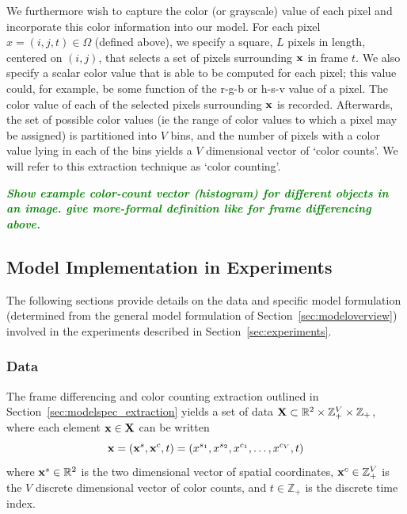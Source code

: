 \documentclass[smallcondensed, final]{svjour3}
\newcommand{\willie}[1]{\textcolor{green}{\textsf{\emph{\textbf{\textcolor{green}{#1}}}}}}
\begin{document}
We furthermore wish to capture the color (or grayscale) value of each pixel and incorporate this color information into our model. For each pixel $x = (i, j, t) \in \Omega$ (defined above), we specify a square, $L$ pixels in length, centered on $(i, j)$, that selects a set of pixels surrounding $\bold{x}$ in frame $t$. We also specify a scalar color value that is able to be computed for each pixel; this value could, for example, be some function of the r-g-b or h-s-v value of a pixel. The color value of each of the selected pixels surrounding $\bold{x}$ is recorded. Afterwards, the set of possible color values (ie the range of color values to which a pixel may be assigned) is partitioned into $V$ bins, and the number of pixels with a color value lying in each of the bins yields a $V$ dimensional vector of `color counts'. We will refer to this extraction technique as `color counting'.

\willie{Show example color-count vector (histogram) for different objects in an image. give more-formal definition like for frame differencing above.}






\subsection{Model Implementation in Experiments}

The following sections provide details on the data and specific model formulation (determined from the general model formulation of Section~\ref{sec:modeloverview}) involved in the experiments described in Section~\ref{sec:experiments}.






\subsubsection{Data}

The frame differencing and color counting extraction outlined in Section~\ref{sec:modelspec_extraction} yields a set of data $\bold{X} \subset \mathbb{R}^{2} \times \mathbb{Z}_{+}^{V} \times \mathbb{Z}_{+}$, where each element $\bold{x} \in \bold{X}$ can be written
\begin{equation}
\bold{x} = ( \bold{x}^{s}, \bold{x}^{c}, t ) = ( x^{s_{1}}, x^{s_{2}}, x^{c_{1}}, \ldots, x^{c_{V}}, t )
\end{equation}
where $\bold{x}^{s} \in \mathbb{R}^{2}$ is the two dimensional vector of spatial coordinates,  $\bold{x}^{c} \in \mathbb{Z}_{+}^{V}$ is the $V$ discrete dimensional vector of color counts, and $t \in \mathbb{Z}_{+}$ is the discrete time index. 
\end{document}

